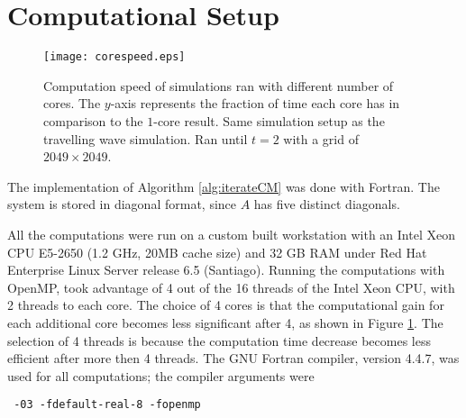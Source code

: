 \section{Computational Setup}

\begin{figure}[!htp]
  \centering
  \texttt{[image: corespeed.eps]}
  \caption{Computation speed of simulations ran with different number of cores.
    The $y$-axis represents the fraction of time each core has in comparison to the $1$-core result.
    Same simulation setup as the travelling wave simulation.
    Ran until $t = 2$ with a grid of $2049 \times 2049$. }
  \label{fig:corespeed}
\end{figure}

The implementation of Algorithm \ref{alg:iterateCM} was done with Fortran. 
The system is stored in diagonal format, since $A$ has five distinct diagonals.

All the computations were run on a custom built workstation with an Intel Xeon CPU E5-2650 (1.2 GHz, 20MB cache size) and 32 GB RAM under Red Hat Enterprise Linux Server release 6.5 (Santiago). 
Running the computations with OpenMP, took advantage of 4 out of the 16 threads of the Intel Xeon CPU, with 2 threads to each core.
The choice of 4 cores is that the computational gain for each additional core becomes less significant after 4, as shown in Figure \ref{fig:corespeed}.
The selection of 4 threads is because the computation time decrease becomes less efficient after more then 4 threads. 
The GNU Fortran compiler, version 4.4.7, was used for all computations; the compiler arguments were
\begin{verbatim} -03 -fdefault-real-8 -fopenmp \end{verbatim}



